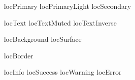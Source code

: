 \usepackage{xcolor}



locPrimary
locPrimaryLight
locSecondary

locText
locTextMuted
locTextInverse

locBackground
locSurface

locBorder

locInfo
locSuccess
locWarning
locError
